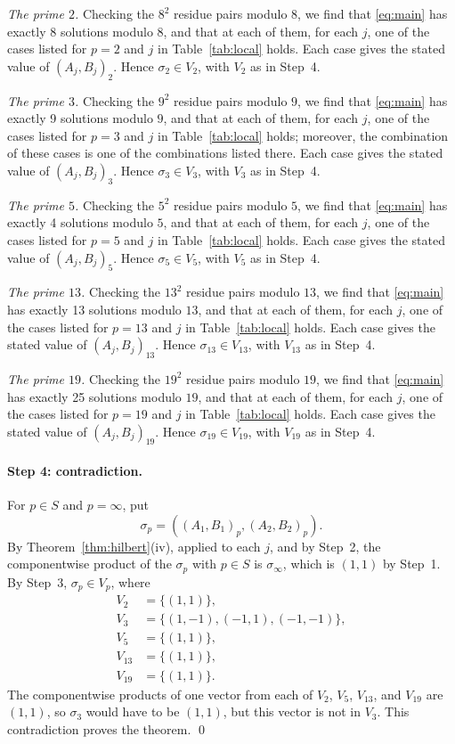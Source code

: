 \documentclass[11pt]{article}
\begin{document}
\emph{The prime $2$.} Checking the $8^2$ residue pairs modulo $8$, we find that \eqref{eq:main} has exactly 8 solutions modulo $8$, and that at each of them, for each $j$, one of the cases listed for $p=2$ and $j$ in Table~\ref{tab:local} holds. Each case gives the stated value of $(A_j,B_j)_{2}$. Hence $\sigma_{2}\in V_{2}$, with $V_{2}$ as in Step~4.

\emph{The prime $3$.} Checking the $9^2$ residue pairs modulo $9$, we find that \eqref{eq:main} has exactly 9 solutions modulo $9$, and that at each of them, for each $j$, one of the cases listed for $p=3$ and $j$ in Table~\ref{tab:local} holds; moreover, the combination of these cases is one of the combinations listed there. Each case gives the stated value of $(A_j,B_j)_{3}$. Hence $\sigma_{3}\in V_{3}$, with $V_{3}$ as in Step~4.

\emph{The prime $5$.} Checking the $5^2$ residue pairs modulo $5$, we find that \eqref{eq:main} has exactly 4 solutions modulo $5$, and that at each of them, for each $j$, one of the cases listed for $p=5$ and $j$ in Table~\ref{tab:local} holds. Each case gives the stated value of $(A_j,B_j)_{5}$. Hence $\sigma_{5}\in V_{5}$, with $V_{5}$ as in Step~4.

\emph{The prime $13$.} Checking the $13^2$ residue pairs modulo $13$, we find that \eqref{eq:main} has exactly 13 solutions modulo $13$, and that at each of them, for each $j$, one of the cases listed for $p=13$ and $j$ in Table~\ref{tab:local} holds. Each case gives the stated value of $(A_j,B_j)_{13}$. Hence $\sigma_{13}\in V_{13}$, with $V_{13}$ as in Step~4.

\emph{The prime $19$.} Checking the $19^2$ residue pairs modulo $19$, we find that \eqref{eq:main} has exactly 25 solutions modulo $19$, and that at each of them, for each $j$, one of the cases listed for $p=19$ and $j$ in Table~\ref{tab:local} holds. Each case gives the stated value of $(A_j,B_j)_{19}$. Hence $\sigma_{19}\in V_{19}$, with $V_{19}$ as in Step~4.

\paragraph{Step 4: contradiction.} For $p\in S$ and $p=\infty$, put \[\sigma_p=((A_{1},B_{1})_p,(A_{2},B_{2})_p).\] By Theorem~\ref{thm:hilbert}(iv), applied to each $j$, and by Step~2, the componentwise product of the $\sigma_p$ with $p\in S$ is $\sigma_\infty$, which is $(1,1)$ by Step~1. By Step~3, $\sigma_p\in V_p$, where
\begin{align*}
V_{2}&=\{(1,1)\},\\
V_{3}&=\{(1,-1),(-1,1),(-1,-1)\},\\
V_{5}&=\{(1,1)\},\\
V_{13}&=\{(1,1)\},\\
V_{19}&=\{(1,1)\}.
\end{align*}The componentwise products of one vector from each of $V_{2}$, $V_{5}$, $V_{13}$, and $V_{19}$ are $(1,1)$, so $\sigma_{3}$ would have to be $(1,1)$, but this vector is not in $V_{3}$. This contradiction proves the theorem.
\qed
\end{document}
